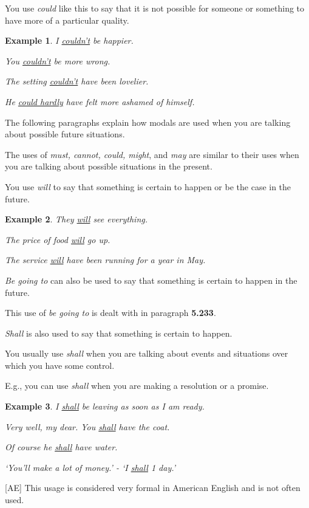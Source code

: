 \documentclass[oneside]{book}
\numberwithin{equation}{section}
\newtheorem{example}{Example}[section]
\begin{document}
You use \textit{could} like this to say that it is not possible for someone or something to have more of a particular quality.
\begin{example}
    I \underline{couldn't} be happier.
    
    You \underline{couldn't} be more wrong.
    
    The setting \underline{couldn't} have been lovelier.
    
    He \underline{could hardly} have felt more ashamed of himself.
\end{example}
%
\noindent{} The following paragraphs explain how modals are used when you are talking about possible future situations.

The uses of \textit{must, cannot, could, might}, and \textit{may} are similar to their uses when you are talking about possible situations in the present.

%
\noindent{} You use \textit{will} to say that something is certain to happen or be the case in the future.
\begin{example}
    They \underline{will} see everything.
    
    The price of food \underline{will} go up.
    
    The service \underline{will} have been running for a year in May.
\end{example}
\textit{Be going to} can also be used to say that something is certain to happen in the future.

This use of \textit{be going to} is dealt with in paragraph \textbf{5.233}.

%
\noindent{} \textit{Shall} is also used to say that something is certain to happen.

You usually use \textit{shall} when you are talking about events and situations over which you have some control.

E.g., you can use \textit{shall} when you are making a resolution or a promise.
\begin{example}
    I \underline{shall} be leaving as soon as I am ready.
    
    Very well, my dear. You \underline{shall} have the coat.
    
    Of course he \underline{shall} have water.
    
    `You'll make a lot of money.' - `I \underline{shall} 1 day.'
\end{example}
[AE] This usage is considered very formal in American English and is not often used.
\end{document}
